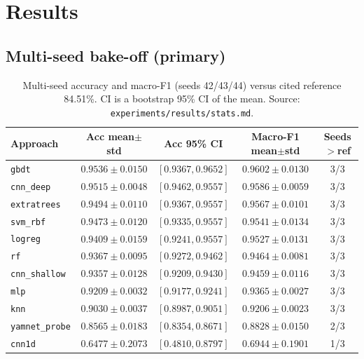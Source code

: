\section{Results}
\label{sec:results}

\subsection{Multi-seed bake-off (primary)}
\begin{table}[H]
\centering
\caption{Multi-seed accuracy and macro-F1 (seeds 42/43/44) versus cited reference 84.51\%.
CI is a bootstrap 95\% CI of the mean. Source: \texttt{experiments/results/stats.md}.}
\label{tab:multiseed}
\scriptsize
\begin{tabular}{@{}lcccc@{}}
\toprule
Approach & Acc mean$\pm$std & Acc 95\% CI & Macro-F1 mean$\pm$std & Seeds$>$ref \\
\midrule
\texttt{gbdt} & $0.9536\pm0.0150$ & $[0.9367,0.9652]$ & $0.9602\pm0.0130$ & 3/3 \\
\texttt{cnn\_deep} & $0.9515\pm0.0048$ & $[0.9462,0.9557]$ & $0.9586\pm0.0059$ & 3/3 \\
\texttt{extratrees} & $0.9494\pm0.0110$ & $[0.9367,0.9557]$ & $0.9567\pm0.0101$ & 3/3 \\
\texttt{svm\_rbf} & $0.9473\pm0.0120$ & $[0.9335,0.9557]$ & $0.9541\pm0.0134$ & 3/3 \\
\texttt{logreg} & $0.9409\pm0.0159$ & $[0.9241,0.9557]$ & $0.9527\pm0.0131$ & 3/3 \\
\texttt{rf} & $0.9367\pm0.0095$ & $[0.9272,0.9462]$ & $0.9464\pm0.0081$ & 3/3 \\
\texttt{cnn\_shallow} & $0.9357\pm0.0128$ & $[0.9209,0.9430]$ & $0.9459\pm0.0116$ & 3/3 \\
\texttt{mlp} & $0.9209\pm0.0032$ & $[0.9177,0.9241]$ & $0.9365\pm0.0027$ & 3/3 \\
\texttt{knn} & $0.9030\pm0.0037$ & $[0.8987,0.9051]$ & $0.9206\pm0.0023$ & 3/3 \\
\texttt{yamnet\_probe} & $0.8565\pm0.0183$ & $[0.8354,0.8671]$ & $0.8828\pm0.0150$ & 2/3 \\
\texttt{cnn1d} & $0.6477\pm0.2073$ & $[0.4810,0.8797]$ & $0.6944\pm0.1901$ & 1/3 \\
\bottomrule
\end{tabular}
\end{table}


